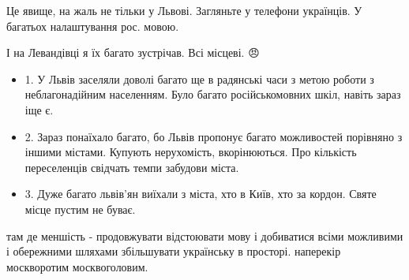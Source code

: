 \begin{itemize}
Це явище, на жаль не тільки у Львові. Загляньте у телефони українців. У багатьох налаштування рос. мовою.

 
І на Левандівці я їх багато зустрічав. Всі місцеві. 😠

 

\begin{itemize}
\item 1. У Львів заселяли доволі багато ще в радянські часи з метою роботи з
неблагонадійним населенням. Було багато російськомовних шкіл, навіть зараз іще
є.

\item 2. Зараз понаїхало багато, бо Львів пропонує багато можливостей порівняно з
іншими містами. Купують нерухомість, вкорінюються. Про кількість переселенців
свідчать темпи забудови міста.

\item 3. Дуже багато львів'ян виїхали з міста, хто в Київ, хто за кордон. Святе місце
пустим не буває.
\end{itemize}


 

там де меншість - продовжувати відстоювати мову і добиватися всіми можливими і
обережними шляхами збільшувати українську в просторі. наперекір москворотим
москвоголовим.
\end{itemize}

